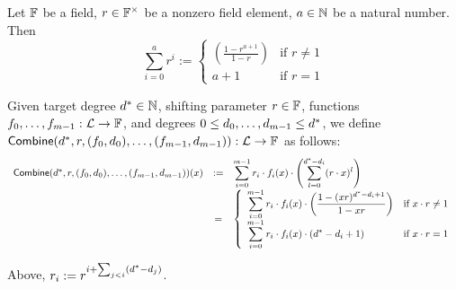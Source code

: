 \begin{lemma}\label{fact:geometric_sum}
\leanok
    Let $\mathbb{F}$ be a field, $r\in\mathbb{F}^\times$ be a nonzero field element, $a\in\mathbb{N}$ be a natural number. Then
    \[
    \sum_{i=0}^{a} r^i :=
    \left\{
    \begin{array}{ll}
        \displaystyle\left(\frac{1 - r^{a+1}}{1 - r}\right)
        & \text{if } r \neq 1 \\[6pt]
        a + 1
        & \text{if } r = 1
    \end{array}
    \right.
    \]

\end{lemma}

\begin{definition}\label{def:combine}
\leanok
    Given target degree $d^*\in\mathbb{N}$, shifting parameter $r\in\mathbb{F}$, functions $f_0,\ldots,f_{m-1}:\mathcal{L}\rightarrow\mathbb{F}$, and degrees $0\leq d_0,\ldots,d_{m-1}\leq {d}^*$, we define $\mathsf{Combine}(d^*,r,(f_0,d_0),\ldots,(f_{m-1},d_{m-1})):\mathcal{L}\rightarrow\mathbb{F}$ as follows:
        \[
        \begin{array}{rcl}
        \mathsf{Combine}(d^*, r, (f_0, d_0), \ldots, (f_{m-1}, d_{m-1}))(x)
        & := & \displaystyle\sum_{i=0}^{m-1} r_i \cdot f_i(x) \cdot \left( \sum_{l=0}^{d^* - d_i} (r \cdot x)^l \right) \\[10pt]
        & = & \left\{
        \begin{array}{ll}
            \displaystyle\sum_{i=0}^{m-1} r_i \cdot f_i(x) \cdot \left( \dfrac{1 - (x r)^{d^* - d_i + 1}}{1 - x r} \right)
            & \text{if } x \cdot r \neq 1 \\[8pt]
            \displaystyle\sum_{i=0}^{m-1} r_i \cdot f_i(x) \cdot (d^* - d_i + 1)
            & \text{if } x \cdot r = 1
        \end{array}
        \right.
        \end{array}
        \]

Above, $r_i:=r^{i+\sum_{j<i}(d^*-d_j)}$.
\end{definition}

